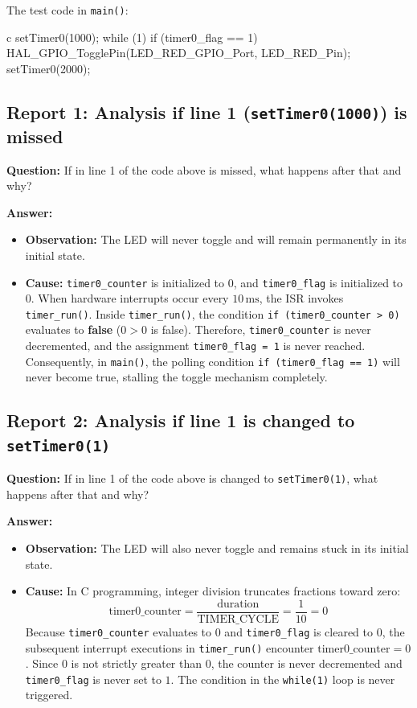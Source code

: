 \documentclass{hcmut-report}
\begin{document}
The test code in \texttt{main()}:
\begin{code}{c}
setTimer0(1000);
while (1) {
    if (timer0_flag == 1) {
        HAL_GPIO_TogglePin(LED_RED_GPIO_Port, LED_RED_Pin);
        setTimer0(2000);
    }
}
\end{code}

\subsection*{Report 1: Analysis if line 1 (\texttt{setTimer0(1000)}) is missed}
\textbf{Question:} If in line 1 of the code above is missed, what happens after that and why?

\textbf{Answer:}
\begin{itemize}
    \item \textbf{Observation:} The LED will never toggle and will remain permanently in its initial state.
    \item \textbf{Cause:} \texttt{timer0\_counter} is initialized to $0$, and \texttt{timer0\_flag} is initialized to $0$. When hardware interrupts occur every $10\,\text{ms}$, the ISR invokes \texttt{timer\_run()}. Inside \texttt{timer\_run()}, the condition \texttt{if (timer0\_counter > 0)} evaluates to \textbf{false} ($0 > 0$ is false). Therefore, \texttt{timer0\_counter} is never decremented, and the assignment \texttt{timer0\_flag = 1} is never reached. Consequently, in \texttt{main()}, the polling condition \texttt{if (timer0\_flag == 1)} will never become true, stalling the toggle mechanism completely.
\end{itemize}

\subsection*{Report 2: Analysis if line 1 is changed to \texttt{setTimer0(1)}}
\textbf{Question:} If in line 1 of the code above is changed to \texttt{setTimer0(1)}, what happens after that and why?

\textbf{Answer:}
\begin{itemize}
    \item \textbf{Observation:} The LED will also never toggle and remains stuck in its initial state.
    \item \textbf{Cause:} In C programming, integer division truncates fractions toward zero:
    \begin{equation}
        \text{timer0\_counter} = \frac{\text{duration}}{\text{TIMER\_CYCLE}} = \frac{1}{10} = 0
    \end{equation}
    Because \texttt{timer0\_counter} evaluates to $0$ and \texttt{timer0\_flag} is cleared to $0$, the subsequent interrupt executions in \texttt{timer\_run()} encounter $\text{timer0\_counter} = 0$. Since $0$ is not strictly greater than $0$, the counter is never decremented and \texttt{timer0\_flag} is never set to $1$. The condition in the \texttt{while(1)} loop is never triggered.
\end{itemize}
\end{document}
